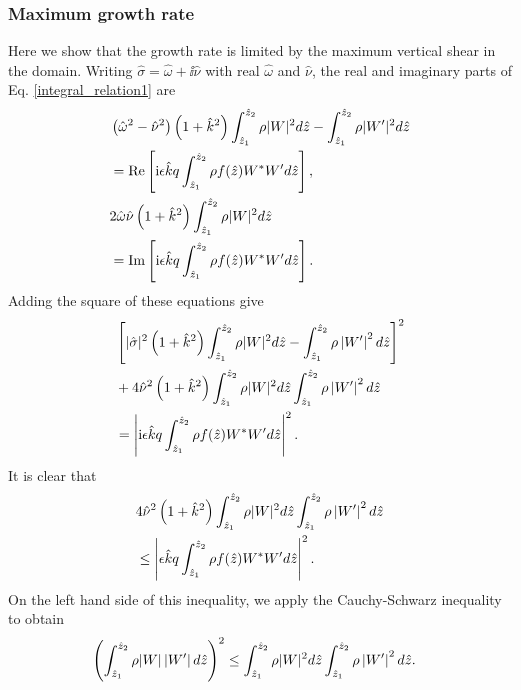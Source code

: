 \subsubsection{Maximum growth rate}   
Here we show that the growth rate is limited by the maximum vertical
shear in the domain. Writing $\hat{\sigma} = \hat{\omega} +
\ii\hat{\nu}$ with real $\hat{\omega}$ and $\hat{\nu}$, the real and
imaginary parts of 
Eq. \ref{integral_relation1} are
\begin{align}
  &\left(\hat{\omega}^2-\hat{\nu}^2\right)\left(1+\hat{k}^2\right)
  \int_{\hat{z}_1}^{\hat{z}_2}\rho|W|^2d\hat{z} -
  \int_{\hat{z}_1}^{\hat{z}_2}\rho|W^\prime|^2d\hat{z}
  \notag\\
  &=\operatorname{Re}\left[\mathrm{i}
    \epsilon\hat{k}q \int_{\hat{z}_1}^{\hat{z}_2}\rho
    f(\hat{z}) W^*W^\prime d\hat{z}\right], \notag\\
  & 2\hat{\omega}\hat{\nu}\left(1+\hat{k}^2\right)
  \int_{\hat{z}_1}^{\hat{z}_2}\rho|W|^2d\hat{z}\notag\\
  &=\operatorname{Im}\left[\mathrm{i}
    \epsilon\hat{k}q \int_{\hat{z}_1}^{\hat{z}_2}\rho
    f(\hat{z}) W^*W^\prime d\hat{z}\right].
\end{align}
Adding the square of these equations give
\begin{align}
  &\left[|\hat{\sigma}|^2\left(1+\hat{k}^2\right)
    \int_{\hat{z}_1}^{\hat{z}_2}\rho|W|^2d\hat{z} -
    \int_{\hat{z}_1}^{\hat{z}_2}\rho\left|W^\prime \right|^2d\hat{z}\right]^2\notag\\
  &+4\hat{\nu}^2\left(1+\hat{k}^2\right) 
  \int_{\hat{z}_1}^{\hat{z}_2}\rho
  |W|^2d\hat{z}\int_{\hat{z}_1}^{\hat{z}_2}\rho\left|W^\prime \right|^2d\hat{z}\notag\\
  &=\left|\mathrm{i}
    \epsilon\hat{k}q\int_{\hat{z}_1}^{\hat{z}_2}\rho
    f(\hat{z}) W^*W^\prime d\hat{z}\right|^2.
\end{align}
It is clear that
\begin{align}\label{sigma_finite_domain} 
  &4\hat{\nu}^2\left(1+\hat{k}^2\right) 
  \int_{\hat{z}_1}^{\hat{z}_2}\rho
  |W|^2d\hat{z}\int_{\hat{z}_1}^{\hat{z}_2}\rho\left|W^\prime \right|^2d\hat{z}\notag\\
  &\leq\left|
    \epsilon\hat{k}q\int_{\hat{z}_1}^{\hat{z}_2}\rho
    f(\hat{z}) W^*W^\prime d\hat{z}\right|^2.
\end{align}
On the left hand side of this inequality, we apply the Cauchy-Schwarz
inequality to obtain
\begin{align}
  &\left( \int_{\hat{z}_1}^{\hat{z}_2}\rho
    |W|\left|W^\prime \right|d\hat{z}\right)^2\leq
  \int_{\hat{z}_1}^{\hat{z}_2}\rho 
  |W|^2d\hat{z}\int_{\hat{z}_1}^{\hat{z}_2}\rho\left|W^\prime \right|^2d\hat{z}.
\end{align}
